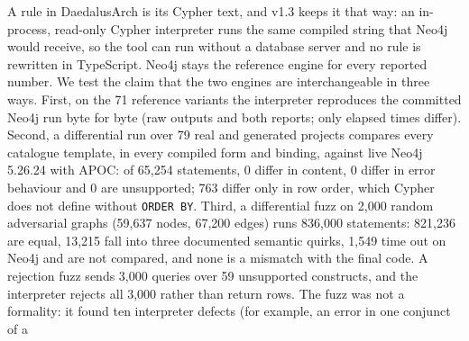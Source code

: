 \documentclass[10pt,a4paper]{article}
\newcommand{\explor}{\textsuperscript{\textsf{\tiny[expl]}}}
\newcommand{\tool}{DaedalusArch}
\begin{document}
A rule in \tool{} is its Cypher text, and v1.3 keeps it that way: an in-process, read-only Cypher interpreter runs
the same compiled string that Neo4j would receive, so the tool can run without a database server and no rule is
rewritten in TypeScript. Neo4j stays the reference engine for every reported number.
We test the claim that the two engines are interchangeable in three ways. First, on the 71 reference variants the
interpreter reproduces the committed Neo4j run byte for byte (raw outputs and both reports; only elapsed times
differ). Second, a differential run over 79 real and generated projects compares every catalogue template, in every
compiled form and binding, against live Neo4j 5.26.24 with APOC: of 65,254 statements, 0 differ in content, 0 differ
in error behaviour and 0 are unsupported; 763 differ only in row order, which Cypher does not define without
\texttt{ORDER BY}. Third, a differential fuzz on 2,000 random adversarial graphs (59,637 nodes, 67,200 edges) runs
836,000 statements: 821,236 are equal, 13,215 fall into three documented semantic quirks, 1,549 time out on Neo4j and
are not compared, and none is a mismatch with the final code. A rejection fuzz sends 3,000 queries over 59
unsupported constructs, and the interpreter rejects all 3,000 rather than return rows.
The fuzz was not a formality: it found ten interpreter defects (for example, an error in one conjunct of a
\end{document}
